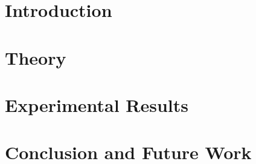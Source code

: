 
\addtolength{\evensidemargin}{-12mm}

\part[Introduction]{Introduction}
\label{part:introduction}



\part[Theory]{Theory}
\label{part:theoretical_background}




\part[Experimental Results]{Experimental Results}
\label{part:experiments}



\part[Conclusion and Future Work]{Conclusion and Future Work}
\label{part:conclusion}

